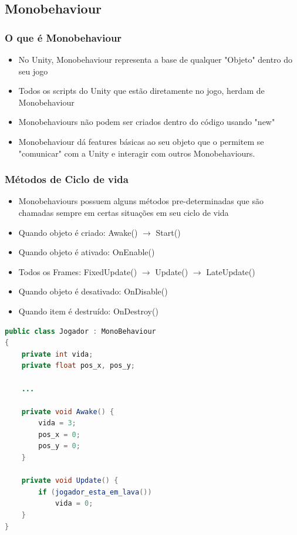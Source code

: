 \documentclass{beamer}
\begin{document}
	\subsection{Monobehaviour}
	\begin{frame}
		\frametitle{O que é Monobehaviour}
		\begin{itemize}
			\item No Unity, Monobehaviour representa a base de qualquer
				"Objeto" dentro do seu jogo

			\item Todos os scripts do Unity que estão diretamente no jogo,
				herdam de Monobehaviour

			\item Monobehaviours não podem ser criados dentro do código usando
				"new"

			\item Monobehaviour dá features básicas ao seu objeto que o
				permitem se "comunicar" com a Unity e interagir com outros
				Monobehaviours.
		\end{itemize}
	\end{frame}

	\begin{frame}
		\frametitle{Métodos de Ciclo de vida}

		\begin{itemize}
			\item Monobehaviours possuem alguns métodos pre-determinadas que
				são chamadas sempre em certas situações em seu ciclo de vida

			\item Quando objeto é criado: Awake() $\rightarrow$ Start()

			\item Quando objeto é ativado: OnEnable()

			\item Todos os Frames: FixedUpdate() $\rightarrow$ Update() $\rightarrow$ LateUpdate()

			\item Quando objeto é desativado: OnDisable()

			\item Quando item é destruído: OnDestroy()
		\end{itemize}
	\end{frame}

	\begin{frame}[fragile]
		\begin{lstlisting}[language=Java,basicstyle=\ttfamily,keywordstyle=\color{blue}]
public class Jogador : MonoBehaviour
{
	private int vida;
	private float pos_x, pos_y;

	...

	private void Awake() {
		vida = 3;
		pos_x = 0;
		pos_y = 0;
	}

	private void Update() {
		if (jogador_esta_em_lava())
			vida = 0;
	}
}
		\end{lstlisting}
	\end{frame}
\end{document}
